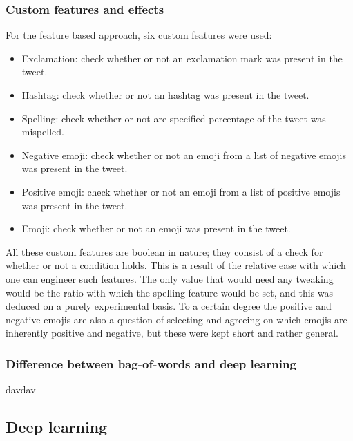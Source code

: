 \subsubsection{Custom features and effects}
For the feature based approach, six custom features were used:
\begin{itemize}
\item Exclamation: check whether or not an exclamation mark was present in the tweet.
\item Hashtag: check whether or not an hashtag was present in the tweet.
\item Spelling: check whether or not are specified percentage of the tweet was mispelled.
\item Negative emoji: check whether or not an emoji from a list of negative emojis was present in the tweet.
\item Positive emoji: check whether or not an emoji from a list of positive emojis was present in the tweet.
\item Emoji: check whether or not an emoji was present in the tweet.
\end{itemize}
All these custom features are boolean in nature; they consist of a check for whether or not a condition holds. This is a result of the relative ease with which one can engineer such features. The only value that would need any tweaking would be the ratio with which the spelling feature would be set, and this was deduced on a purely experimental basis. To a certain degree the positive and negative emojis are also a question of selecting and agreeing on which emojis are inherently positive and negative, but these were kept short and rather general.

\subsubsection{Difference between bag-of-words and deep learning}
davdav

\subsection{Deep learning}
